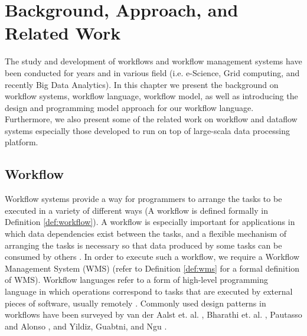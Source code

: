 \chapter{Background, Approach, and Related Work} 

The study and development of workflows and workflow management systems have been conducted for years and in various field (i.e. e-Science, Grid computing, and recently Big Data Analytics). In this chapter we present the background on workflow systems, workflow language, workflow model, as well as introducing the design and programming model approach for our workflow language. Furthermore, we also present some of the related work on workflow and dataflow systems especially those developed to run on top of large-scala data processing platform. 

\section{Workflow}

Workflow systems \cite{yu2005taxonomy,deelman2009workflows,von2007work,barker2008scientific} provide a way for programmers to arrange the tasks to be executed in a variety of different ways (A workflow is defined formally in Definition \ref{def:workflow}). A workflow is especially important for applications in which data dependencies exist between the tasks, and a flexible mechanism of arranging the tasks is necessary so that data produced by some tasks can be consumed by others \cite{kelly2011applying}. 
In order to execute such a workflow, we require a Workflow Management System (WMS) \cite{von2007work} (refer to Definition \ref{def:wms} for a formal definition of WMS). Workflow languages refer to a form of high-level programming language in which operations correspond to tasks that are executed by external pieces of software, usually remotely \cite{kelly2011applying}. Commonly used design patterns in workflows have been surveyed by van der Aalst et. al. \cite{van2003workflow}, Bharathi et. al. \cite{bharathi2008characterization}, Pautasso and Alonso \cite{pautasso2006parallel}, and Yildiz, Guabtni, and Ngu \cite{yildiz2009towards}.

